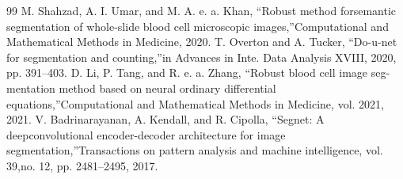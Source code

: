 \documentclass[conference]{IEEEtran}
\begin{document}
\begin{thebibliography}{99}
 M. Shahzad, A. I. Umar, and M. A. e. a. Khan, “Robust method forsemantic segmentation of whole-slide blood cell microscopic images,”Computational and Mathematical Methods in Medicine, 2020.
 T. Overton and A. Tucker, “Do-u-net for segmentation and counting,”in Advances in Inte. Data Analysis XVIII, 2020, pp. 391–403.
 D. Li, P. Tang, and R. e. a. Zhang, “Robust blood cell image seg-mentation method based on neural ordinary differential equations,”Computational and Mathematical Methods in Medicine, vol. 2021, 2021.
 V. Badrinarayanan, A. Kendall, and R. Cipolla, “Segnet: A deepconvolutional encoder-decoder architecture for image segmentation,”Transactions on pattern analysis and machine intelligence, vol. 39,no. 12, pp. 2481–2495, 2017.
\end{thebibliography}
\end{document}
